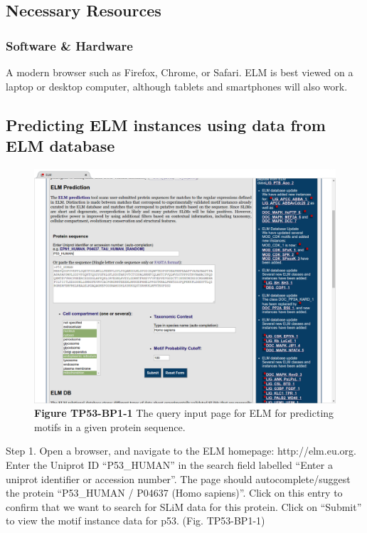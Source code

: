 \subsection{Necessary Resources}\label{necessary-resources}

\subsubsection{Software \& Hardware}\label{software-hardware}

A modern browser such as Firefox, Chrome, or Safari. ELM is best viewed
on a laptop or desktop computer, although tablets and smartphones will
also work.

\subsection{Predicting ELM instances using data from ELM
database}\label{predicting-elm-instances-using-data-from-elm-database}

\begin{figure}[h!]
\centering
\includegraphics[width=\textwidth]{Figures/TP53_1/elm_search.png} 
\caption{
\textbf{Figure TP53-BP1-1}
The query input page for ELM for predicting motifs in a
given protein sequence.
}
\end{figure}

Step 1. Open a browser, and navigate to the ELM homepage:
http://elm.eu.org. Enter the Uniprot ID ``P53\_HUMAN'' in the search
field labelled ``Enter a uniprot identifier or accession number''. The
page should autocomplete/suggest the protein ``P53\_HUMAN / P04637 (Homo
sapiens)''. Click on this entry to confirm that we want to search for
SLiM data for this protein. Click on ``Submit'' to view the motif
instance data for p53. (Fig. TP53-BP1-1)

